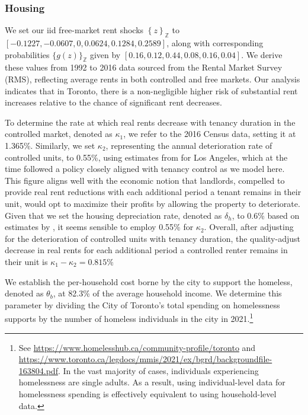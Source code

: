 \documentclass[parskip=full]{article}
\begin{document}
\subsubsection{Housing}

We set our iid free-market rent shocks $\left\{z\right\}_{\mathbb{Z}}$ to $\left[-0.1227,-0.0607,0,0.0624,0.1284,0.2589\right]$, along with corresponding probabilities $\{g(z)\}_{\mathbb{Z}}$ given by $\left[0.16,0.12,0.44,0.08,0.16,0.04\right]$. We derive these values from 1992 to 2016 data sourced from the Rental Market Survey (RMS), reflecting average rents in both controlled and free markets. Our analysis indicates that in Toronto, there is a non-negligible higher risk of substantial rent increases relative to the chance of significant rent decreases.

To determine the rate at which real rents decrease with tenancy duration in the controlled market, denoted as $\kappa_{1}$, we refer to the 2016 Census data, setting it at 1.365\%. Similarly, we set $\kappa_{2}$, representing the annual deterioration rate of controlled units, to 0.55\%, using estimates from \citet{murray_et_al-1991} for Los Angeles, which at the time followed a policy closely aligned with tenancy control as we model here. This figure aligns well with the economic notion that landlords, compelled to provide real rent reductions with each additional period a tenant remains in their unit, would opt to maximize their profits by allowing the property to deteriorate. Given that we set the housing depreciation rate, denoted as $\delta_{h}$, to 0.6\% based on estimates by \citet{rosenthal-2014}, it seems sensible to employ 0.55\% for $\kappa_{2}$. Overall, after adjusting for the deterioration of controlled units with tenancy duration, the quality-adjust decrease in real rents for each additional period a controlled renter remains in their unit is $\kappa_1-\kappa_2=0.815\%$

We establish the per-household cost borne by the city to support the homeless, denoted as $\theta_{b}$, at 82.3\% of the average household income. We determine this parameter by dividing the City of Toronto's total spending on homelessness supports by the number of homeless individuals in the city in 2021.\footnote{See \url{https://www.homelesshub.ca/community-profile/toronto} and \url{https://www.toronto.ca/legdocs/mmis/2021/ex/bgrd/backgroundfile-163804.pdf}. In the vast majority of cases, individuals experiencing homelessness are single adults. As a result, using individual-level data for homelessness spending is effectively equivalent to using household-level data.}
\end{document}

